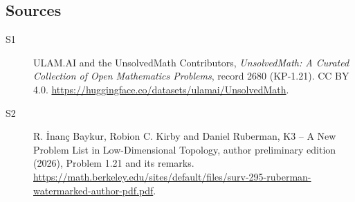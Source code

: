 \documentclass[11pt]{article}
\begin{document}
\subsection{Sources}
\begin{description}
\item[\hypertarget{source:2680:1}{S1}] ULAM.AI and the UnsolvedMath Contributors, \emph{UnsolvedMath: A Curated Collection of Open Mathematics Problems}, record 2680 (KP-1.21). CC BY 4.0. \url{https://huggingface.co/datasets/ulamai/UnsolvedMath}.
\item[\hypertarget{source:2680:2}{S2}] R. \.{I}nan\c{c} Baykur, Robion C. Kirby and Daniel Ruberman, K3 -- A New Problem List in Low-Dimensional Topology, author preliminary edition (2026), Problem 1.21 and its remarks. \url{https://math.berkeley.edu/sites/default/files/surv-295-ruberman-watermarked-author-pdf.pdf}.
\end{description}
\label{end:2680}
\end{document}
